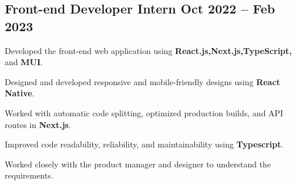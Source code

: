 



\subsection{{Front-end Developer Intern  \hfill Oct 2022 -- Feb 2023}}
\begin{zitemize}
\item Developed the front-end web application using \textbf{React.js,Next.js,TypeScript,} and \textbf{ MUI}.
\item Designed and developed responsive and mobile-friendly designs using \textbf{React Native}.
\item Worked with automatic code splitting, optimized production builds, and API routes in \textbf{Next.js}.
\item Improved code readability, reliability, and maintainability using \textbf{Typescript}.
\item Worked closely with the product manager and designer to understand the requirements.
\end{zitemize}


